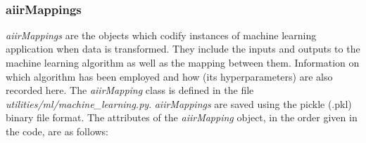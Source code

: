 \documentclass[a4paper,12pt,english]{article}
\begin{document}
\begin{itemize}
    \end{itemize}\\

    \subsubsection{aiirMappings}
    \textit{aiirMappings} are the objects which codify instances of machine learning application when data is transformed. They include the inputs and outputs to the machine learning algorithm as well as the mapping between them. Information on which algorithm has been employed and how (its hyperparameters) are also recorded here. The \textit{aiirMapping} class is defined in the file \textit{utilities/ml/machine\_learning.py}. \textit{aiirMappings} are saved using the pickle (.pkl) binary file format. The attributes of the \textit{aiirMapping} object, in the order given in the code, are as follows:
\end{document}
